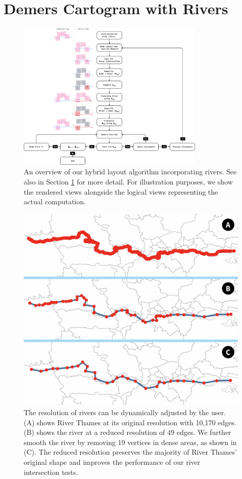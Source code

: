 \section{Demers Cartogram with Rivers}
\label{sec:main}

 {
  \begin{figure}[tb!]
      \centering
      \includegraphics[width=0.8\textwidth,height=\textheight,keepaspectratio]{figure/flowchart.png}
      \caption{An overview of our hybrid layout algorithm incorporating rivers. See also  in Section \ref{sec:main} for more detail. %
       For illustration purposes, we show the rendered views alongside the logical views representing the actual computation.}
      \label{fig:flowchart}
  \end{figure}
 }

 {
  \begin{figure}[tb!]
      \centering
      \includegraphics[width=0.7\columnwidth,keepaspectratio]{figure/river_resolution.png}
      \caption{The resolution of rivers can be dynamically adjusted by the user. (A) shows River Thames at its original resolution with 10,170 edges. (B) shows the river at a reduced resolution of 49 edges. We further smooth the river by removing 19 vertices in dense areas, as shown in (C). The reduced resolution preserves the majority of River Thames' original shape and improves the performance of our river intersection tests.}
      \label{fig:river resolution}
  \end{figure}
 }

